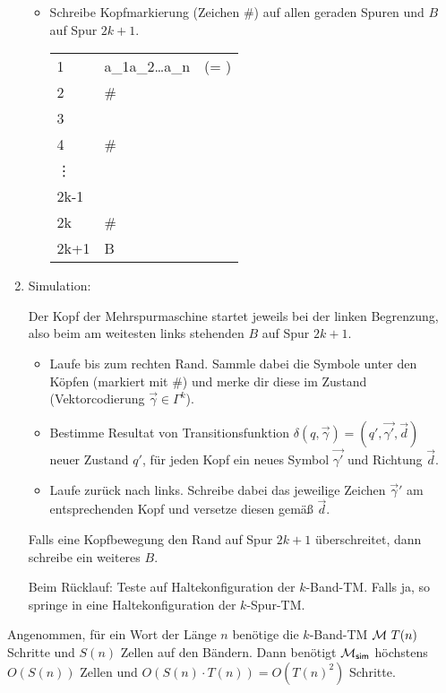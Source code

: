 \begin{Bemerkung}
\begin{enumerate}
	 \begin{itemize}
	  \item Schreibe Kopfmarkierung (Zeichen \#) auf allen geraden Spuren und $B$ auf Spur $2k+1$.
	  
	  	\begin{tabular}{*2{M{l}}}
		1 & a_1a_2\dots a_n~~(= )\\
		2 & \#\\
		3 & \blank\\
		4 & \#\\
		\vdots\\
		2k-1 & \blank\\
		2k & \#\\
		2k+1 & \blank B \blank
	\end{tabular} 
	 \end{itemize}
	 
    \item Simulation:

	Der Kopf der Mehrspurmaschine startet jeweils bei der linken Begrenzung, also beim am weitesten links stehenden $B$ auf Spur $2k+1$.
	\begin{itemize}
		\item Laufe bis zum rechten Rand.
		Sammle dabei die Symbole unter den Köpfen (markiert mit \#) und merke dir diese im Zustand (Vektorcodierung $\overrightarrow{\gamma} \in \Gamma^k$).
		\item Bestimme Resultat von Transitionsfunktion $\delta(q,\overrightarrow{\gamma})=(q',\overrightarrow{\gamma'},\overrightarrow{d})$\\
		neuer Zustand $q'$, für jeden Kopf ein neues Symbol $\overrightarrow{\gamma'}$ und Richtung $\overrightarrow{d}$.
		\item Laufe zurück nach links.
		Schreibe dabei das jeweilige Zeichen $\overrightarrow{\gamma}'$ am entsprechenden Kopf und versetze diesen gemäß $\overrightarrow{d}$.
	\end{itemize}
	Falls eine Kopfbewegung den Rand auf Spur $2k+1$ überschreitet, dann schreibe ein weiteres $B$.
	
	Beim Rücklauf: Teste auf Haltekonfiguration der $k$-Band-\ac{TM}.
	Falls ja, so springe in eine Haltekonfiguration der $k$-Spur-\ac{TM}.
% 	
	\qedhere
	\end{enumerate}
\end{Bemerkung}


\begin{Bemerkung}
	Angenommen, für ein Wort der Länge $n$ benötige die $k$-Band-\ac{TM} $\mathcal{M}\ T(n)$ Schritte und $S(n)$ Zellen auf den Bändern.
	Dann benötigt $\mathcal{M}_\mathsf{sim}$ höchstens $O(S(n))$ Zellen und $O(S(n)\cdot T(n))=O(T(n)^2)$ Schritte.
\end{Bemerkung}





